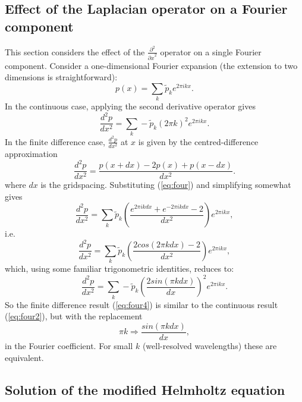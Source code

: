 \documentclass[11pt, a4paper,twoside]{article}
\newcommand{\ns}[2]{\frac{d^2 #1}{d #2^2}}
\newcommand{\ps}[2]{\frac{\partial^2 #1}{{\partial #2}^2}}
\numberwithin{equation}{section}
\begin{document}
\subsection{Effect of the Laplacian operator on a Fourier component}\label{sub:four}
This section considers the effect of the $\ps{}{x}$ operator on a single Fourier component.
Consider a one-dimensional Fourier expansion (the extension to two dimensions is straightforward):
\begin{equation}\label{eq:four}p(x) = \sum_k \tilde{p}_k e^{2\pi i k x}.
\end{equation}
In the continuous case, applying the second derivative operator gives
\begin{equation}\label{eq:four2}
\ns{p}{x} = \sum_k - \tilde{p}_k  (2\pi k)^2 e^{2\pi i k x}.
\end{equation}
In the finite difference case, $\ns{p}{x}$ at $x$ is given by the centred-difference approximation
\begin{equation}\label{eq:four3}
\ns{p}{x} = \frac{p(x+dx) - 2 p(x) + p(x-dx)}{dx^2}.
\end{equation}where $dx$ is the gridspacing.
Substituting (\ref{eq:four}) and simplifying somewhat gives\begin{equation}
\ns{p}{x} =\sum_k \tilde{p}_k  \left(\frac{e^{2\pi i k dx} + e^{-2\pi i k dx} -2}{dx^2}\right) e^{2\pi i k x},
\end{equation}
i.e.
\begin{equation}
\ns{p}{x} =\sum_k \tilde{p}_k  \left(\frac{2 cos(2\pi k dx) -2 } {dx^2}\right)e^{2\pi i k x},
\end{equation}
which, using some familiar trigonometric identities, reduces to:
\begin{equation}\label{eq:four4}
\ns{p}{x} =  \sum_k -\tilde{p}_k  \left(\frac{2 sin(\pi k dx) }{dx}\right)^2e^{2\pi i k x}.
\end{equation}
So the finite difference result (\ref{eq:four4}) is similar to the continuous result (\ref{eq:four2}), but with the replacement
\begin{equation}\label{eq:to}
\pi k \Rightarrow \frac{sin(\pi k dx)}{dx},
\end{equation}
in the Fourier coefficient.
For small $k$ (well-resolved wavelengths) these are equivalent.


\subsection{Solution of the modified Helmholtz equation}\label{sub:helm}
\end{document}
